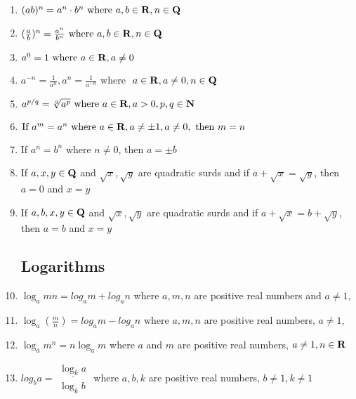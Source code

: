 \documentclass[a4paper]{article}
\begin{document}
\begin{enumerate}
\item
$(ab)^n = a^{n} \cdot b^n \textrm{ where } a,b \in \mathbf{R}, n \in \mathbf{Q}$

\item
$(\frac{a}{b})^n = \frac{a^n}{b^n} \textrm{ where } a,b \in \mathbf{R}, n \in \mathbf{Q}$

\item
$a^0 = 1 \textrm{ where } a \in \mathbf{R}, a \neq 0$

\item
$a^{-n} = \frac{1}{a^n}, a^n = \frac{1}{a^{-n}} \textrm{ where }$
$a \in \mathbf{R}, a \neq 0, n \in \mathbf{Q}$

\item
$a^{p/q} = \sqrt[q]{a^p} \textrm { where } a \in \mathbf{R}, a > 0, p,q \in \mathbf{N}$

\item
$\textrm{If } a^m = a^n  \textrm{ where } a \in \mathbf{R}, a \neq \pm 1, a \neq 0, 
\textrm{ then } m=n$

\item 
If $a^n=b^n$ where $ n \neq 0$, then  $a = \pm b$

\item
If $a,x,y \in \mathbf{Q}$ and $\sqrt x,  \sqrt y$
are quadratic surds and if $a+\sqrt x = \sqrt y$,
then $a=0$ and $x=y$

\item 
If $a,b,x,y \in \mathbf{Q}$ and $\sqrt x,  \sqrt y$
are quadratic surds and if $a+\sqrt x = b+\sqrt y$,
then $a=b$ and $x=y$

\subsection{Logarithms}

\item
$\log_a{mn} = log_a{m}+log_a{n}$
where $a,m,n$ are positive real numbers and $a \neq 1$,

\item
$\log_a(\frac{m}{n}) = log_a{m}-log_a{n}$
where $a,m,n$ are positive real numbers, $a \neq 1$,

\item
$\log_a m ^n = n \log_a m$
where $a$ and $m$ are positive real numbers, $a \neq 1, n \in \mathbf{R}$

\item
$log_b a = 
\begin{array}{c}\underline{\log_k a} \\ \log_k b \end{array}
$
where $a,b,k$ are positive real numbers, $b \neq 1, k \neq 1$


\end{enumerate}
\end{document}
